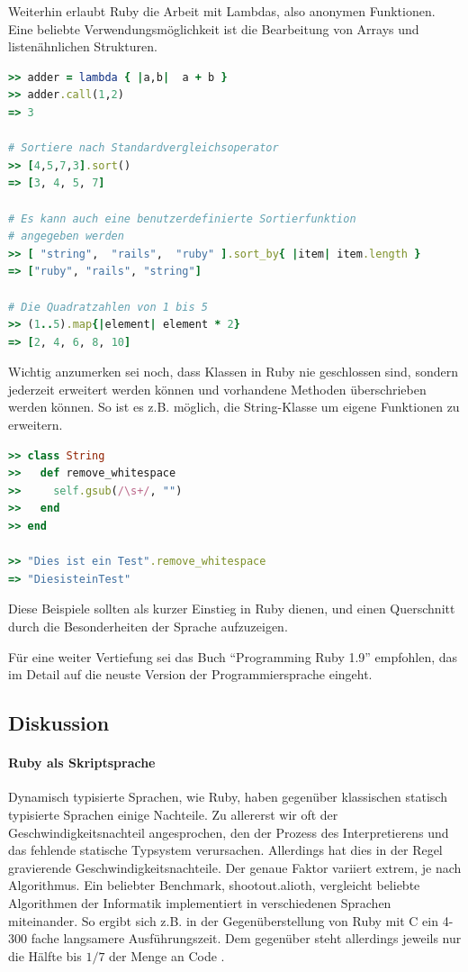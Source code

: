 Weiterhin erlaubt Ruby die Arbeit mit Lambdas, also anonymen Funktionen. Eine beliebte Verwendungsmöglichkeit ist die Bearbeitung von Arrays und listenähnlichen Strukturen.

\begin{lstlisting}[language=Ruby,label=Ruby Beispiel: Lambdas,caption=Ruby Beispiel: Lambdas]
>> adder = lambda { |a,b|  a + b }
>> adder.call(1,2)
=> 3

# Sortiere nach Standardvergleichsoperator
>> [4,5,7,3].sort()
=> [3, 4, 5, 7]

# Es kann auch eine benutzerdefinierte Sortierfunktion
# angegeben werden
>> [ "string",  "rails",  "ruby" ].sort_by{ |item| item.length }
=> ["ruby", "rails", "string"]

# Die Quadratzahlen von 1 bis 5
>> (1..5).map{|element| element * 2}
=> [2, 4, 6, 8, 10]
\end{lstlisting}

Wichtig anzumerken sei noch, dass Klassen in Ruby nie geschlossen sind, sondern jederzeit erweitert werden können und vorhandene Methoden überschrieben werden können. So ist es z.B. möglich, die String-Klasse um eigene Funktionen zu erweitern.

\begin{lstlisting}[language=Ruby,label=Ruby Beispiel offene Klassen,caption=Ruby Beispiel offene Klassen]
>> class String
>>   def remove_whitespace
>>     self.gsub(/\s+/, "")
>>   end
>> end

>> "Dies ist ein Test".remove_whitespace
=> "DiesisteinTest"

\end{lstlisting}

Diese Beispiele sollten als kurzer Einstieg in Ruby dienen, und einen Querschnitt durch die Besonderheiten der Sprache aufzuzeigen.

Für eine weiter Vertiefung sei das Buch "`Programming Ruby 1.9"' empfohlen, das im Detail auf die neuste Version der Programmiersprache eingeht. %

\subsection{Diskussion}

\paragraph{Ruby als Skriptsprache}
Dynamisch typisierte Sprachen, wie Ruby, haben gegenüber klassischen statisch typisierte Sprachen einige Nachteile. Zu allererst wir oft der Geschwindigkeitsnachteil angesprochen, den der Prozess des Interpretierens und das fehlende statische Typsystem verursachen.
Allerdings hat dies in der Regel gravierende Geschwindigkeitsnachteile. Der genaue Faktor variiert extrem, je nach Algorithmus. Ein beliebter Benchmark, shootout.alioth, vergleicht beliebte Algorithmen der Informatik implementiert in verschiedenen Sprachen miteinander. So ergibt sich z.B. in der Gegenüberstellung von Ruby mit C ein 4-300 fache langsamere Ausführungszeit. Dem gegenüber steht allerdings jeweils nur die Hälfte bis $1/7$ der Menge an Code \citep{computer_language_benchmarks_game_ruby_2011}.


